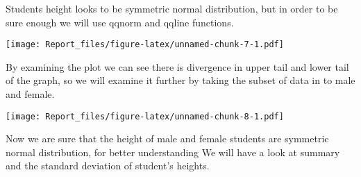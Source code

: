 \documentclass[
]{article}
\newenvironment{Shaded}{\begin{snugshade}}{\end{snugshade}}
\newcommand{\DataTypeTok}[1]{\textcolor[rgb]{0.13,0.29,0.53}{#1}}
\newcommand{\DecValTok}[1]{\textcolor[rgb]{0.00,0.00,0.81}{#1}}
\newcommand{\KeywordTok}[1]{\textcolor[rgb]{0.13,0.29,0.53}{\textbf{#1}}}
\newcommand{\NormalTok}[1]{#1}
\newcommand{\OperatorTok}[1]{\textcolor[rgb]{0.81,0.36,0.00}{\textbf{#1}}}
\newcommand{\StringTok}[1]{\textcolor[rgb]{0.31,0.60,0.02}{#1}}
\begin{document}
Students height looks to be symmetric normal distribution, but in order
to be sure enough we will use qqnorm and qqline functions.

\begin{Shaded}
\end{Shaded}

\texttt{[image: Report\_files/figure-latex/unnamed-chunk-7-1.pdf]}

By examining the plot we can see there is divergence in upper tail and
lower tail of the graph, so we will examine it further by taking the
subset of data in to male and female.

\begin{Shaded}
\end{Shaded}

\texttt{[image: Report\_files/figure-latex/unnamed-chunk-8-1.pdf]}

Now we are sure that the height of male and female students are
symmetric normal distribution, for better understanding We will have a
look at summary and the standard deviation of student's heights.
\end{document}

